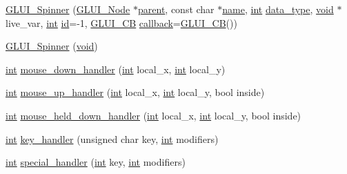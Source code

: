 \begin{DoxyCompactItemize}
\item 
\hyperlink{class_g_l_u_i___spinner_ac78385b3436ef915b5e706f1f1b19b49}{G\+L\+U\+I\+\_\+\+Spinner} (\hyperlink{class_g_l_u_i___node}{G\+L\+U\+I\+\_\+\+Node} $\ast$\hyperlink{class_g_l_u_i___node_a8ed65d447784f6f88bd3e2e2bcac6cdb}{parent}, const char $\ast$\hyperlink{glext_8h_ad977737dfc9a274a62741b9500c49a32}{name}, \hyperlink{wglext_8h_a500a82aecba06f4550f6849b8099ca21}{int} \hyperlink{class_g_l_u_i___spinner_a821f0e5b5f040f93f53ee7441abfc44e}{data\+\_\+type}, \hyperlink{wglext_8h_a9e6b7f1933461ef318bb000d6bd13b83}{void} $\ast$live\+\_\+var, \hyperlink{wglext_8h_a500a82aecba06f4550f6849b8099ca21}{int} \hyperlink{glext_8h_a58c2a664503e14ffb8f21012aabff3e9}{id}=-\/1, \hyperlink{class_g_l_u_i___c_b}{G\+L\+U\+I\+\_\+\+C\+B} \hyperlink{class_g_l_u_i___control_a96060fe0cc6d537e736dd6eef78e24ab}{callback}=\hyperlink{class_g_l_u_i___c_b}{G\+L\+U\+I\+\_\+\+C\+B}())
\item 
\hyperlink{class_g_l_u_i___spinner_aa2cbeb4f8d15819d14938a4395db152e}{G\+L\+U\+I\+\_\+\+Spinner} (\hyperlink{wglext_8h_a9e6b7f1933461ef318bb000d6bd13b83}{void})
\item 
\hyperlink{wglext_8h_a500a82aecba06f4550f6849b8099ca21}{int} \hyperlink{class_g_l_u_i___spinner_aa88057ac6073205f9e1509cad08e6b0b}{mouse\+\_\+down\+\_\+handler} (\hyperlink{wglext_8h_a500a82aecba06f4550f6849b8099ca21}{int} local\+\_\+x, \hyperlink{wglext_8h_a500a82aecba06f4550f6849b8099ca21}{int} local\+\_\+y)
\item 
\hyperlink{wglext_8h_a500a82aecba06f4550f6849b8099ca21}{int} \hyperlink{class_g_l_u_i___spinner_a85650009d91d672e3c192f60760b1704}{mouse\+\_\+up\+\_\+handler} (\hyperlink{wglext_8h_a500a82aecba06f4550f6849b8099ca21}{int} local\+\_\+x, \hyperlink{wglext_8h_a500a82aecba06f4550f6849b8099ca21}{int} local\+\_\+y, bool inside)
\item 
\hyperlink{wglext_8h_a500a82aecba06f4550f6849b8099ca21}{int} \hyperlink{class_g_l_u_i___spinner_aae95829438240c9b6a293905356e322c}{mouse\+\_\+held\+\_\+down\+\_\+handler} (\hyperlink{wglext_8h_a500a82aecba06f4550f6849b8099ca21}{int} local\+\_\+x, \hyperlink{wglext_8h_a500a82aecba06f4550f6849b8099ca21}{int} local\+\_\+y, bool inside)
\item 
\hyperlink{wglext_8h_a500a82aecba06f4550f6849b8099ca21}{int} \hyperlink{class_g_l_u_i___spinner_a29dd55ebbd9967c508b0d6aad85d209a}{key\+\_\+handler} (unsigned char key, \hyperlink{wglext_8h_a500a82aecba06f4550f6849b8099ca21}{int} modifiers)
\item 
\hyperlink{wglext_8h_a500a82aecba06f4550f6849b8099ca21}{int} \hyperlink{class_g_l_u_i___spinner_a22e78681f3b47b2b5436686ad23523bb}{special\+\_\+handler} (\hyperlink{wglext_8h_a500a82aecba06f4550f6849b8099ca21}{int} key, \hyperlink{wglext_8h_a500a82aecba06f4550f6849b8099ca21}{int} modifiers)

\end{DoxyCompactItemize}
